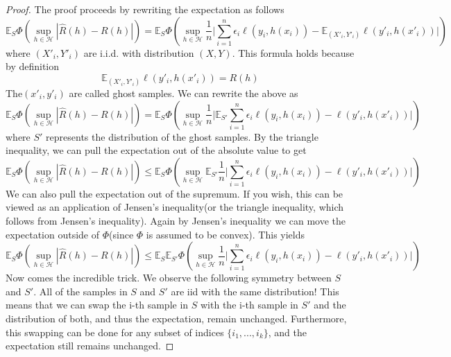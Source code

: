 \begin{proof}
	The proof proceeds by rewriting the expectation as follows
	\begin{equation}
	\mathbb{E}_S\Phi\left(\sup_{h \in \mathcal{H}}|\hat{R}(h)-R(h)| \right)=\mathbb{E}_S\Phi\left(\sup_{h \in \mathcal{H}}\frac{1}{n} \bigg|\sum_{i=1}^{n}\epsilon_i \ell(y_i,h(x_i))-\mathbb{E}_{(X'_i,Y'_i)} \ell(y'_i,h(x'_i))\bigg| \right)
	\end{equation}
	where $(X'_i,Y'_i)$ are i.i.d. with distribution $(X,Y)$. This formula holds because by definition
	\begin{equation}
	\mathbb{E}_{(X'_i,Y'_i)} \ell(y'_i,h(x'_i)) = R(h)
	\end{equation}
	The$(x'_i,y'_i)$ are called ghost samples. We can rewrite the above as
	\begin{equation}
	\mathbb{E}_S\Phi\left(\sup_{h \in \mathcal{H}}|\hat{R}(h)-R(h)| \right)=\mathbb{E}_S\Phi\left(\sup_{h \in \mathcal{H}}\frac{1}{n} \bigg|\mathbb{E}_{S'} \sum_{i=1}^{n}\epsilon_i \ell(y_i,h(x_i))-\ell(y'_i,h(x'_i)) \bigg| \right)
	\end{equation}
	where $S'$ represents the distribution of the ghost samples. By the triangle
	inequality, we can pull the expectation out of the absolute value to get
	\begin{equation}
	\mathbb{E}_S\Phi\left(\sup_{h \in \mathcal{H}}|\hat{R}(h)-R(h)| \right) \leq \mathbb{E}_S\Phi\left(\sup_{h \in \mathcal{H}} \mathbb{E}_{S'} \frac{1}{n} \bigg| \sum_{i=1}^{n}\epsilon_i \ell(y_i,h(x_i))-\ell(y'_i,h(x'_i)) \bigg| \right)
	\end{equation}
	We can also pull the expectation out of the supremum. If you wish, this can be
	viewed as an application of Jensen's inequality(or the triangle inequality, which follows from Jensen's inequality). Again by Jensen's inequality we can move the expectation outside of $\Phi$(since $\Phi$ is assumed to be convex). This yields
	\begin{equation}
	\mathbb{E}_S\Phi\left(\sup_{h \in \mathcal{H}}|\hat{R}(h)-R(h)| \right) \leq \mathbb{E}_S\mathbb{E}_{S'}\Phi\left(\sup_{h \in \mathcal{H}} \frac{1}{n} \bigg| \sum_{i=1}^{n}\epsilon_i \ell(y_i,h(x_i))-\ell(y'_i,h(x'_i)) \bigg| \right)
	\end{equation}
	Now comes the incredible trick. We observe the following symmetry between $S$ and $S'$. All of the samples in $S$ and $S'$ are iid with the same distribution! This means that we can swap the i-th sample in $S$ with the i-th sample in $S'$ and the distribution of both, and thus the expectation, remain	unchanged. Furthermore, this swapping can be done for any subset of indices $\{i_1,...,i_k\}$, and the expectation still remains unchanged.
	

\end{proof}
